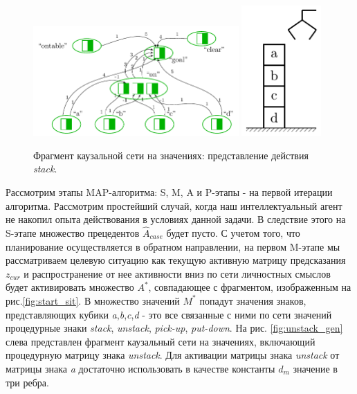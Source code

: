 \documentclass[12pt]{scrartcl}
\begin{document}
	\begin{figure}
		\centering
		\includegraphics[width=0.7\textwidth,page=2]{examples/plan/plan_nets}
		\includegraphics[width=0.27\textwidth,page=3]{examples/plan/block_world}
		\caption{Фрагмент каузальной сети на значениях: представление действия \textit{stack}.}	
		\label{fig:stack_sig}	
	\end{figure}

	Рассмотрим этапы MAP-алгоритма: S, M, A и P-этапы - на первой итерации алгоритма. Рассмотрим простейший случай, когда наш интеллектуальный агент не накопил опыта действования в условиях данной задачи. В следствие этого на S-этапе множество прецедентов $\hat A_{case}$ будет пусто. С учетом того, что планирование осуществляется в обратном направлении, на первом M-этапе мы рассматриваем целевую ситуацию как текущую активную матрицу предсказания $z_{cur}$ и распространение от нее активности вниз по сети личностных смыслов будет активировать множество $A^*$, совпадающее с фрагментом, изображенным на рис.\ref{fig:start_sit}. В множество значений $M^*$ попадут значения знаков, представляющих кубики \textit{a},\textit{b},\textit{c},\textit{d} - это все связанные с ними по сети значений процедурные знаки \textit{stack}, \textit{unstack}, \textit{pick-up}, \textit{put-down}. На рис. \ref{fig:unstack_gen} слева представлен фрагмент каузальный сети на значениях, включающий процедурную матрицу знака \textit{unstack}. Для активации матрицы знака \textit{unstack} от матрицы знака \textit{a} достаточно использовать в качестве константы $d_m$ значение в три ребра.
\end{document}
